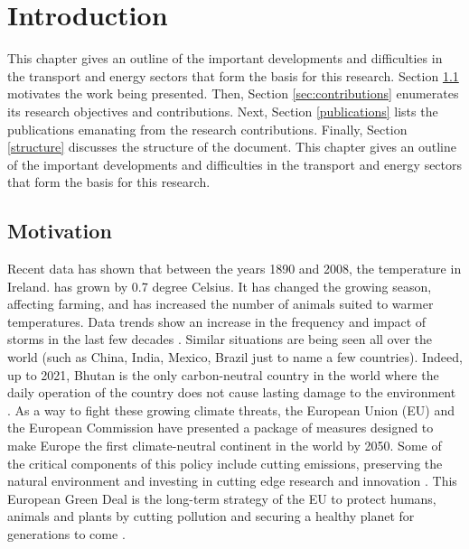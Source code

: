 \chapter{Introduction}
\label{chapter1}
This chapter gives an outline of the important developments and difficulties in the transport
and energy sectors that form the basis for this research. Section \ref{sec:motivation} motivates the work being presented. Then, Section \ref{sec:contributions} enumerates its research objectives and contributions. Next, Section \ref{publications} lists the publications emanating from the research contributions. Finally, Section \ref{structure} discusses the structure of the document. This chapter gives an outline of the important developments and difficulties in the transport and energy sectors that form the basis for this research.

\section{Motivation}
\label{sec:motivation}

Recent data has shown that between the years 1890 and 2008, the temperature in Ireland. 
has grown by 0.7 degree Celsius. It has changed the growing season, affecting farming, and
has increased the number of animals suited to warmer temperatures. Data trends show an
increase in the frequency and impact of storms in the last few decades \cite{alfaseeh2019multi}. Similar situations are being seen all over the world (such as China, India, Mexico, Brazil just to name a few countries). Indeed, up to 2021, Bhutan is the only carbon-neutral country in the world where the daily operation of the country does not cause lasting damage to the environment \cite{europeancommission2024promoting}. As a way to fight these growing climate threats, the European Union (EU) and the European Commission have presented a package of measures designed to make Europe the first climate-neutral continent in the world by 2050. Some of the critical components of this policy include cutting emissions, preserving the natural environment and investing in cutting edge research and innovation \cite{shariff2022state} . This European Green Deal is the long-term strategy of the EU to protect humans, animals and plants by cutting pollution and securing a healthy planet for generations to come \cite{greendeal}.

